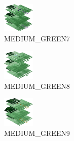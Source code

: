 \hspace{0.1cm}
\begin{minipage}[b]{0.15\linewidth}
\begin{figure}[H]                                                          
  \centering                                                             
  \begin{adjustbox}{width=1.5cm,center}                                   
  \includegraphics[width=1.5cm]{src/colorspace_colourflow/flows/colourflow_199-45.png}%
  \end{adjustbox}                                                        
\caption*{MEDIUM\_GREEN7}                                           
\end{figure}                                                               
\end{minipage}
\hspace{0.1cm}
\begin{minipage}[b]{0.15\linewidth}
\begin{figure}[H]                                                          
  \centering                                                             
  \begin{adjustbox}{width=1.5cm,center}                                   
  \includegraphics[width=1.5cm]{src/colorspace_colourflow/flows/colourflow_200-45.png}%
  \end{adjustbox}                                                        
\caption*{MEDIUM\_GREEN8}                                           
\end{figure}                                                               
\end{minipage}
\hspace{0.1cm}
\begin{minipage}[b]{0.15\linewidth}
\begin{figure}[H]                                                          
  \centering                                                             
  \begin{adjustbox}{width=1.5cm,center}                                   
  \includegraphics[width=1.5cm]{src/colorspace_colourflow/flows/colourflow_201-45.png}%
  \end{adjustbox}                                                        
\caption*{MEDIUM\_GREEN9}                                           
\end{figure}                                                               
\end{minipage}

